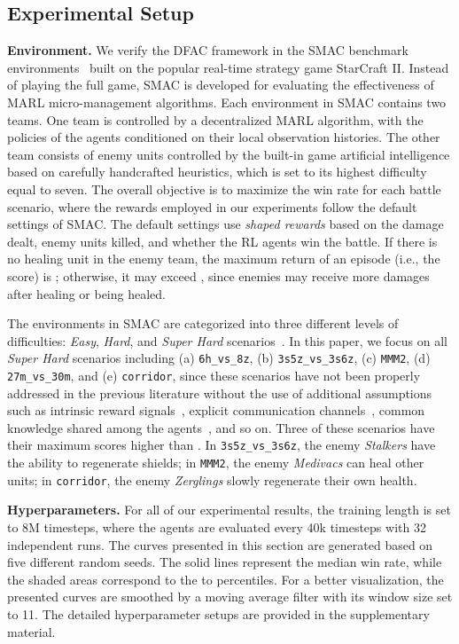 \documentclass{article}
\begin{document}
\subsection{Experimental Setup}
\label{subsec:experiment_results_setup_of_smac}

\textbf{Environment.}
We verify the DFAC framework in the SMAC benchmark environments~\cite{Samvelyan2019SMAC} built on the popular real-time strategy game StarCraft II. Instead of playing the full game, SMAC is developed for evaluating the effectiveness of MARL micro-management algorithms. Each environment in SMAC contains two teams. One team is controlled by a decentralized MARL algorithm, with the policies of the agents conditioned on their local observation histories. The other team consists of enemy units controlled by the built-in game artificial intelligence based on carefully handcrafted heuristics, which is set to its highest difficulty equal to seven. The overall objective is to maximize the win rate for each battle scenario, where the rewards employed in our experiments follow the default settings of SMAC. The default settings use \textit{shaped rewards} based on the damage dealt, enemy units killed, and whether the RL agents win the battle. If there is no healing unit in the enemy team, the maximum return of an episode (i.e., the score) is ; otherwise, it may exceed , since enemies may receive more damages after healing or being healed.

The environments in SMAC are categorized into three different levels of difficulties: \textit{Easy}, \textit{Hard}, and \textit{Super Hard} scenarios~\cite{Samvelyan2019SMAC}. In this paper, we focus on all \textit{Super Hard} scenarios including (a) \texttt{6h\_vs\_8z},  (b) \texttt{3s5z\_vs\_3s6z}, (c) \texttt{MMM2}, (d) \texttt{27m\_vs\_30m}, and (e) \texttt{corridor}, since these scenarios have not been properly addressed in the previous literature without the use of additional assumptions such as intrinsic reward signals~\cite{Du2019LIIR}, explicit communication channels~\cite{Zhang2019VBN,Wang2019NDQ}, common knowledge shared among the agents~\cite{De2019MACKRL,Wang2020ROMA}, and so on. Three of these scenarios have their maximum scores higher than . In \texttt{3s5z\_vs\_3s6z}, the enemy \textit{Stalkers} have the ability to regenerate shields; in \texttt{MMM2}, the enemy \textit{Medivacs} can heal other units; in \texttt{corridor}, the enemy \textit{Zerglings} slowly regenerate their own health.

\textbf{Hyperparameters.}
For all of our experimental results, the training length is set to 8M timesteps, where the agents are evaluated every 40k timesteps with 32 independent runs. The curves presented in this section are generated based on five different random seeds. The solid lines represent the median win rate, while the shaded areas correspond to the  to  percentiles. For a better visualization, the presented curves are smoothed by a moving average filter with its window size set to 11. The detailed hyperparameter setups are provided in the supplementary material.
\end{document}
